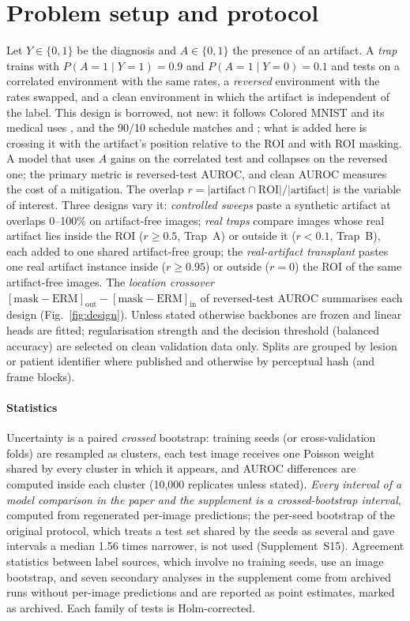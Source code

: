 \documentclass[review,3p]{elsarticle}
\begin{document}
\section{Problem setup and protocol}\label{sec:setup}
Let $Y\in\{0,1\}$ be the diagnosis and $A\in\{0,1\}$ the presence of an artifact. A \emph{trap} trains with
$P(A{=}1\mid Y{=}1)=0.9$ and $P(A{=}1\mid Y{=}0)=0.1$ and tests on a correlated environment with the same rates,
a \emph{reversed} environment with the rates swapped, and a clean environment in which the artifact is independent of
the label. This design is borrowed, not new: it follows Colored MNIST \citep{arjovsky2019irm} and its medical uses
\citep{bissoto2020debiasing,puli2022nurd,viviano2021saliency,bassi2024isnet}, and the 90/10 schedule matches
\citet{puli2022nurd} and \citet{viviano2021saliency}; what is
added here is crossing it with the artifact's position relative to the ROI and with ROI masking. A model that uses $A$ gains on the correlated test and collapses on the reversed one; the primary metric is
reversed-test AUROC, and clean AUROC measures the cost of a mitigation. The overlap
$r=|\mathrm{artifact}\cap\mathrm{ROI}|/|\mathrm{artifact}|$ is the variable of interest. Three designs vary it:
\emph{controlled sweeps} paste a synthetic artifact at overlaps 0--100\% on artifact-free images; \emph{real traps}
compare images whose real artifact lies inside the ROI ($r\ge0.5$, Trap~A) or outside it ($r<0.1$, Trap~B), each added
to one shared artifact-free group; the \emph{real-artifact transplant} pastes one real artifact instance inside
($r\ge0.95$) or outside ($r=0$) the ROI of the same artifact-free images. The \emph{location crossover}
$[\text{mask}-\text{ERM}]_{\text{out}}-[\text{mask}-\text{ERM}]_{\text{in}}$ of reversed-test AUROC summarises each
design (Fig.~\ref{fig:design}). Unless stated otherwise backbones are frozen and linear heads are fitted; regularisation strength and the
decision threshold (balanced accuracy) are selected on clean validation data only. Splits are grouped by lesion or
patient identifier where published and otherwise by perceptual hash (and frame blocks).


\paragraph{Statistics} Uncertainty is a paired \emph{crossed} bootstrap: training seeds (or cross-validation folds)
are resampled as clusters, each test image receives one Poisson weight shared by every cluster in which it appears,
and AUROC differences are computed inside each cluster (10,000 replicates unless stated). \emph{Every interval of a
model comparison in the paper and the supplement is a crossed-bootstrap interval}, computed from regenerated per-image
predictions; the per-seed bootstrap of the original protocol, which treats a test set shared by the seeds as several
and gave intervals a median 1.56 times narrower, is not used (Supplement~S15). Agreement statistics between label
sources, which involve no training seeds, use an image bootstrap, and seven secondary analyses in the supplement come
from archived runs without per-image predictions and are reported as point estimates, marked as archived. Each family
of tests is Holm-corrected.
\end{document}
